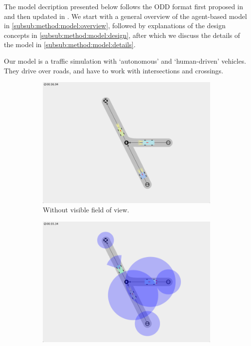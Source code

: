 The model decription presented below follows the ODD format first proposed in \textcite{grimm2006standard} and then updated in \textcite{grimm2010odd}. We start with a general overview of the agent-based model in \cref{subsub:method:model:overview}, followed by explanations of the design concepts in \cref{subsub:method:model:design}, after which we discuss the details of the model in \cref{subsub:method:model:details}. 

Our model is a traffic simulation with `autonomous' and `human-driven' vehicles. They drive over roads, and have to work with intersections and crossings. 


\begin{figure}
	\centering
	\begin{subfigure}{0.49\textwidth}
		\centering
		\includegraphics[width=\textwidth]{./img/model_simulationView}
		\caption{Without visible field of view.}
		\label{fig:model:simulation:fix}
	\end{subfigure}
	\begin{subfigure}{0.49\textwidth}
		\centering
		\includegraphics[width=\textwidth]{./img/model_simulationView_fieldOfView}

\end{subfigure}
\end{figure}
